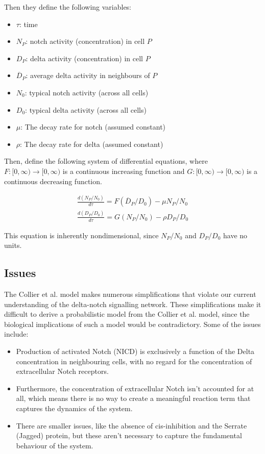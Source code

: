 \documentclass{article}
\begin{document}
\begin{flushleft}
Then they define the following variables:

\begin{itemize}
  \item $\tau$: time
  \item $N_{P}$: notch activity (concentration) in cell $P$
  \item $D_{P}$: delta activity (concentration) in cell $P$
  \item $\overline{D}_{P}$: average delta activity in neighbours of $P$
  \item $N_{0}$: typical notch activity (across all cells)
  \item $D_{0}$: typical delta activity (across all cells)
  \item $\mu$: The decay rate for notch (assumed constant)
  \item $\rho$: The decay rate for delta (assumed constant)
\end{itemize}

Then, define the following system of differential equations, where $F:[0, \infty) \rightarrow [0, \infty)$ is a continuous increasing function and $G: [0, \infty)\rightarrow [0, \infty)$ is a continuous decreasing function.

$$
\begin{aligned}
  \frac{d(N_{P} / N_{0})}{d\tau} = F(\overline{D}_{P} / D_{0}) - \mu N_{P} / N_{0} \\[5pt]
  \frac{d(D_{P} / D_{0})}{d\tau} = G(N_{P} / N_{0}) - \rho D_{P} / D_{0}
\end{aligned}
$$

This equation is inherently nondimensional, since $N_{P} / N_{0}$ and $D_{P} / D_{0}$ have no units.

\newpage

\subsection{Issues}

The Collier et al. model makes numerous simplifications that violate our current understanding of the delta-notch signalling network. These simplifications make it difficult to derive a probabilistic model from the Collier et al. model, since the biological implications of such a model would be contradictory. Some of the issues include:

\begin{itemize}
  \item Production of activated Notch (NICD) is exclusively a function of the Delta concentration in neighbouring cells, with no regard for the concentration of extracellular Notch receptors.
  \item Furthermore, the concentration of extracellular Notch isn't accounted for at all, which means there is no way to create a meaningful reaction term that captures the dynamics of the system.
  \item There are smaller issues, like the absence of cis-inhibition and the Serrate (Jagged) protein, but these aren't necessary to capture the fundamental behaviour of the system.
\end{itemize}


\end{flushleft}
\end{document}
